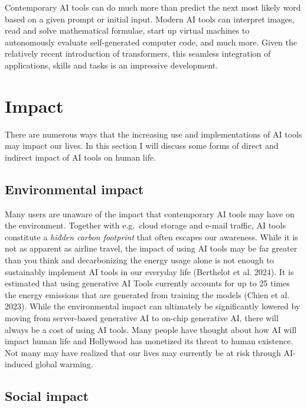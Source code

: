 \documentclass[
  letterpaper,
  DIV=11,
  numbers=noendperiod]{scrreprt}
\begin{document}
Contemporary AI tools can do much more than predict the next most likely
word based on a given prompt or initial input. Modern AI tools can
interpret images, read and solve mathematical formulae, start up virtual
machines to autonomously evaluate self-generated computer code, and much
more. Given the relatively recent introduction of transformers, this
seamless integration of applications, skills and tasks is an impressive
development.


\chapter{Impact}\label{impact}

There are numerous ways that the increasing use and implementations of
AI tools may impact our lives. In this section I will discuss some forms
of direct and indirect impact of AI tools on human life.

\section{Environmental impact}\label{environmental-impact}

Many users are unaware of the impact that contemporary AI tools may have
on the environment. Together with e.g.~cloud storage and e-mail traffic,
AI tools constitute a \emph{hidden carbon footprint} that often escapes
our awareness. While it is not as apparent as airline travel, the impact
of using AI tools may be far greater than you think and decarbonizing
the energy usage alone is not enough to sustainably implement AI tools
in our everyday life (Berthelot et al. 2024). It is estimated that using
generative AI Tools currently accounts for up to 25 times the energy
emissions that are generated from training the models (Chien et al.
2023). While the environmental impact can ultimately be significantly
lowered by moving from server-based generative AI to on-chip generative
AI, there will always be a cost of using AI tools. Many people have
thought about how AI will impact human life and Hollywood has monetized
its threat to human existence. Not many may have realized that our lives
may currently be at risk through AI-induced global warming.

\section{Social impact}\label{social-impact}
\end{document}
